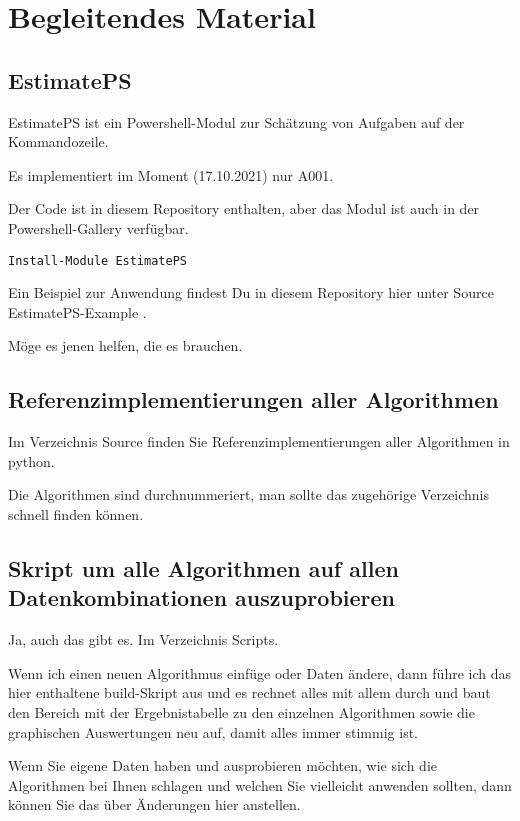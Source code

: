 \newpage{}

\section{Begleitendes Material}

\subsection{EstimatePS}

EstimatePS ist ein Powershell-Modul zur Schätzung von Aufgaben auf der Kommandozeile. 

Es implementiert im Moment (17.10.2021) nur A001.

Der Code ist in diesem Repository enthalten, aber das Modul ist auch in der Powershell-Gallery verfügbar.

\begin{verbatim}
Install-Module EstimatePS
\end{verbatim}

Ein Beispiel zur Anwendung findest Du in diesem Repository hier unter Source\\EstimatePS-Example .

Möge es jenen helfen, die es brauchen.

\subsection{Referenzimplementierungen aller Algorithmen}

Im Verzeichnis Source finden Sie Referenzimplementierungen aller Algorithmen in python. 

Die Algorithmen sind durchnummeriert, man sollte das zugehörige Verzeichnis schnell finden können.

\subsection{Skript um alle Algorithmen auf allen Datenkombinationen auszuprobieren}

Ja, auch das gibt es. Im Verzeichnis Scripts. 

Wenn ich einen neuen Algorithmus einfüge oder Daten ändere, dann führe ich das hier enthaltene build-Skript aus und es rechnet alles mit allem durch und baut den Bereich mit der Ergebnistabelle zu den einzelnen Algorithmen sowie die graphischen Auswertungen neu auf, damit alles immer stimmig ist.

Wenn Sie eigene Daten haben und ausprobieren möchten, wie sich die Algorithmen bei Ihnen schlagen und welchen Sie vielleicht anwenden sollten, dann können Sie das über Änderungen hier anstellen.
